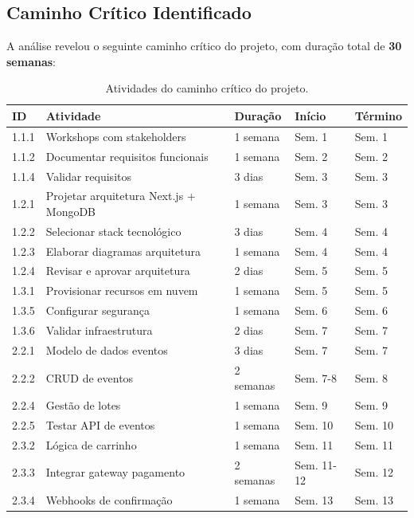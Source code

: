 \subsection{Caminho Crítico Identificado}

A análise revelou o seguinte caminho crítico do projeto, com duração total de \textbf{30 semanas}:

\begin{table}[H]
\centering
\caption{Atividades do caminho crítico do projeto.}%
\label{tab:caminho-critico}
\footnotesize
\begin{tabular}{|p{1cm}|p{6cm}|p{2cm}|p{2cm}|p{2cm}|}
\hline
\textbf{ID} & \textbf{Atividade} & \textbf{Duração} & \textbf{Início} & \textbf{Término} \\ \hline
1.1.1 & Workshops com stakeholders & 1 semana & Sem. 1 & Sem. 1 \\ \hline
1.1.2 & Documentar requisitos funcionais & 1 semana & Sem. 2 & Sem. 2 \\ \hline
1.1.4 & Validar requisitos & 3 dias & Sem. 3 & Sem. 3 \\ \hline
1.2.1 & Projetar arquitetura Next.js + MongoDB & 1 semana & Sem. 3 & Sem. 3 \\ \hline
1.2.2 & Selecionar stack tecnológico & 3 dias & Sem. 4 & Sem. 4 \\ \hline
1.2.3 & Elaborar diagramas arquitetura & 1 semana & Sem. 4 & Sem. 4 \\ \hline
1.2.4 & Revisar e aprovar arquitetura & 2 dias & Sem. 5 & Sem. 5 \\ \hline
1.3.1 & Provisionar recursos em nuvem & 1 semana & Sem. 5 & Sem. 5 \\ \hline
1.3.5 & Configurar segurança & 1 semana & Sem. 6 & Sem. 6 \\ \hline
1.3.6 & Validar infraestrutura & 2 dias & Sem. 7 & Sem. 7 \\ \hline
2.2.1 & Modelo de dados eventos & 3 dias & Sem. 7 & Sem. 7 \\ \hline
2.2.2 & CRUD de eventos & 2 semanas & Sem. 7-8 & Sem. 8 \\ \hline
2.2.4 & Gestão de lotes & 1 semana & Sem. 9 & Sem. 9 \\ \hline
2.2.5 & Testar API de eventos & 1 semana & Sem. 10 & Sem. 10 \\ \hline
2.3.2 & Lógica de carrinho & 1 semana & Sem. 11 & Sem. 11 \\ \hline
2.3.3 & Integrar gateway pagamento & 2 semanas & Sem. 11-12 & Sem. 12 \\ \hline
2.3.4 & Webhooks de confirmação & 1 semana & Sem. 13 & Sem. 13 \\ \hline

\end{tabular}
\end{table}

